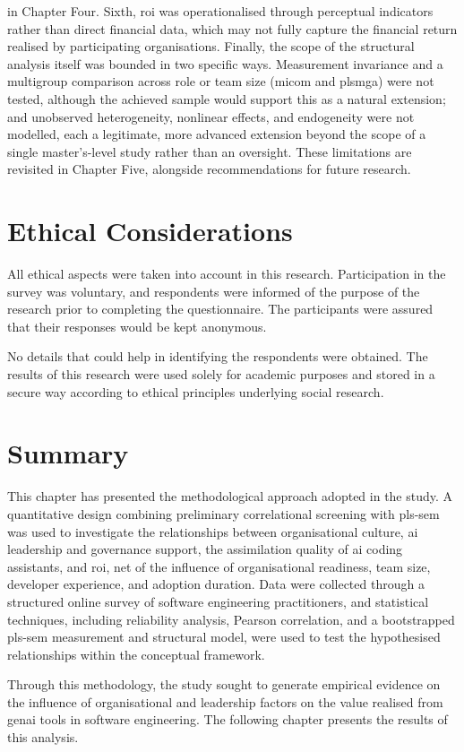 in Chapter Four. Sixth, \gls{roi} was operationalised through perceptual indicators rather than direct financial data, which may not fully capture the financial return realised by participating organisations. Finally, the scope of the structural analysis itself was bounded in two specific ways. Measurement invariance and a multigroup comparison across role or team size (\gls{micom} and \gls{plsmga}) were not tested, although the achieved sample would support this as a natural extension; and unobserved heterogeneity, nonlinear effects, and endogeneity were not modelled, each a legitimate, more advanced extension beyond the scope of a single master's-level study rather than an oversight. These limitations are revisited in Chapter Five, alongside recommendations for future research.

\section{Ethical Considerations}
\label{sec:Ethical Considerations}
All ethical aspects were taken into account in this research. Participation in the survey was voluntary, and respondents were informed of the purpose of the research prior to completing the questionnaire. The participants were assured that their responses would be kept anonymous.

No details that could help in identifying the respondents were obtained. The results of this research were used solely for academic purposes and stored in a secure way according to ethical principles underlying social research.

\section{Summary}
\label{sec:Summary}
This chapter has presented the methodological approach adopted in the study. A quantitative design combining preliminary correlational screening with \gls{pls-sem} was used to investigate the relationships between organisational culture, \gls{ai} leadership and governance support, the assimilation quality of \gls{ai} coding assistants, and \gls{roi}, net of the influence of organisational readiness, team size, developer experience, and adoption duration. Data were collected through a structured online survey of software engineering practitioners, and statistical techniques, including reliability analysis, Pearson correlation, and a bootstrapped \gls{pls-sem} measurement and structural model, were used to test the hypothesised relationships within the conceptual framework.

Through this methodology, the study sought to generate empirical evidence on the influence of organisational and leadership factors on the value realised from \gls{genai} tools in software engineering. The following chapter presents the results of this analysis.

